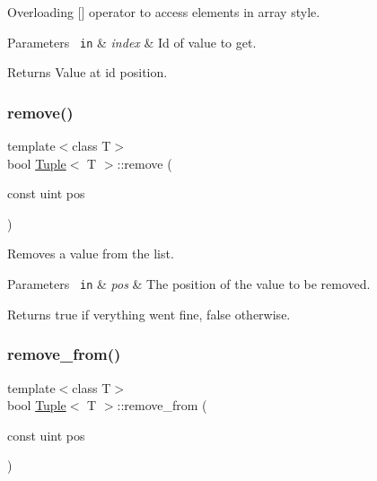 Overloading \mbox{[}\mbox{]} operator to access elements in array style. 


\begin{DoxyParams}[1]{Parameters}
\mbox{\texttt{ in}}  & {\em index} & Id of value to get. \\
\hline
\end{DoxyParams}
\begin{DoxyReturn}{Returns}
Value at id position. 
\end{DoxyReturn}
\mbox{\label{class_tuple_ad7436ece54558c2940f79c539f83f611}} 
\subsubsection{\texorpdfstring{remove()}{remove()}}
{\footnotesize\ttfamily template$<$class T$>$ \\
bool \mbox{\hyperlink{class_tuple}{Tuple}}$<$ T $>$\+::remove (\begin{DoxyParamCaption}\item[{const uint}]{pos }\end{DoxyParamCaption})\hspace{0.3cm}{\ttfamily [inline]}}



Removes a value from the list. 


\begin{DoxyParams}[1]{Parameters}
\mbox{\texttt{ in}}  & {\em pos} & The position of the value to be removed. \\
\hline
\end{DoxyParams}
\begin{DoxyReturn}{Returns}
{\ttfamily true} if verything went fine, {\ttfamily false} otherwise. 
\end{DoxyReturn}
\mbox{\label{class_tuple_a60370cde243871dfafb0ac96404c6f90}} 
\subsubsection{\texorpdfstring{remove\_from()}{remove\_from()}}
{\footnotesize\ttfamily template$<$class T$>$ \\
bool \mbox{\hyperlink{class_tuple}{Tuple}}$<$ T $>$\+::remove\+\_\+from (\begin{DoxyParamCaption}\item[{const uint}]{pos }\end{DoxyParamCaption})\hspace{0.3cm}{\ttfamily [inline]}}



